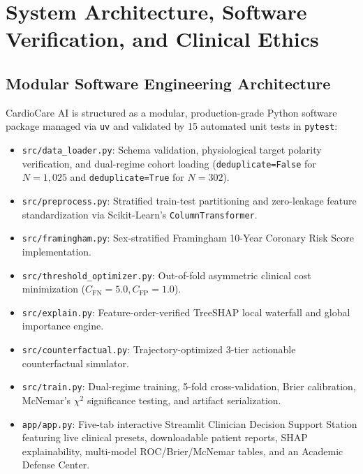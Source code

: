 \documentclass[12pt,a4paper]{report}
\begin{document}
\chapter[System Architecture \& Clinical Ethics]{System Architecture, Software Verification, and Clinical Ethics}

\section{Modular Software Engineering Architecture}
CardioCare AI is structured as a modular, production-grade Python software package managed via \texttt{uv} and validated by 15 automated unit tests in \texttt{pytest}:
\begin{itemize}
    \item \texttt{src/data\_loader.py}: Schema validation, physiological target polarity verification, and dual-regime cohort loading (\texttt{deduplicate=False} for $N=1,025$ and \texttt{deduplicate=True} for $N=302$).
    \item \texttt{src/preprocess.py}: Stratified train-test partitioning and zero-leakage feature standardization via Scikit-Learn's \texttt{ColumnTransformer}.
    \item \texttt{src/framingham.py}: Sex-stratified Framingham 10-Year Coronary Risk Score implementation.
    \item \texttt{src/threshold\_optimizer.py}: Out-of-fold asymmetric clinical cost minimization ($C_{\text{FN}} = 5.0, C_{\text{FP}} = 1.0$).
    \item \texttt{src/explain.py}: Feature-order-verified TreeSHAP local waterfall and global importance engine.
    \item \texttt{src/counterfactual.py}: Trajectory-optimized 3-tier actionable counterfactual simulator.
    \item \texttt{src/train.py}: Dual-regime training, 5-fold cross-validation, Brier calibration, McNemar's $\chi^2$ significance testing, and artifact serialization.
    \item \texttt{app/app.py}: Five-tab interactive Streamlit Clinician Decision Support Station featuring live clinical presets, downloadable patient reports, SHAP explainability, multi-model ROC/Brier/McNemar tables, and an Academic Defense Center.
\end{itemize}
\end{document}
